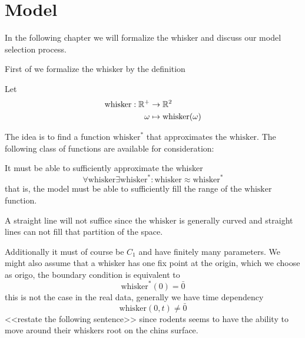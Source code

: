 \section{Model}


In the following chapter we will formalize the whisker and discuss our model
selection\cite{EncylopediaMachineLearning} process.

First of we formalize the whisker by the definition

\begin{definition}
    Let 
    \begin{equation}
    \begin{split}
        \text{whisker} : \mathbb{R}^+ &\rightarrow \mathbb{R}^2 \\
                  \omega&\mapsto \text{whisker}(\omega)
    \end{split}
    \end{equation}
\end{definition}

The idea is to find a function $\text{whisker}^*$ that approximates the $\text{whisker}$. The 
following class of functions are available for consideration:

It must be able to sufficiently approximate the whisker
\begin{equation}
    \forall \text{whisker} \exists \text{whisker}^* : \text{whisker} \approx \text{whisker}^*
\end{equation}
that is, the model must be able to sufficiently fill the range of the $\text{whisker}$ function.

\begin{example}
    A straight line will not suffice since the $\text{whisker}$ is generally
    curved and straight lines can not fill that partition of the space.
\end{example}

Additionally it must of course be $C_1$ and have finitely many parameters.
We might also assume that a whisker has one fix point at the origin, which we
choose as origo, the boundary condition is equivalent to
\begin{equation}
    \label{eq:bv_root}
    \text{whisker}^*(0)=\bar{0}
\end{equation}
this is not the case in the real data, generally we have time dependency
\begin{equation}
    \text{whisker}(0,t)\neq\bar{0} 
\end{equation}
<<restate the following sentence>>
since rodents seems to have the ability to move around their whiskers root on
the chins surface.

